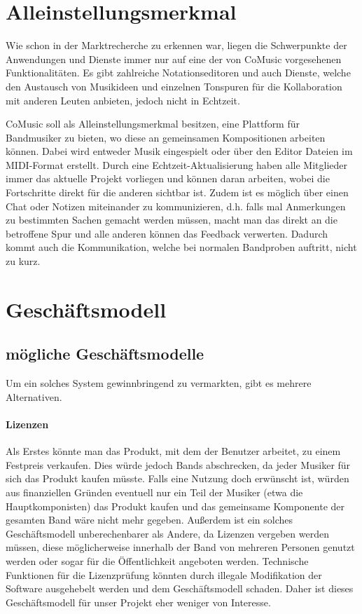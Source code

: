 \documentclass[12pt]{scrartcl}
\begin{document}
\section{Alleinstellungsmerkmal}
Wie schon in der Marktrecherche zu erkennen war, liegen die Schwerpunkte der Anwendungen und Dienste immer nur auf eine der von CoMusic vorgesehenen Funktionalitäten. Es gibt zahlreiche Notationseditoren und auch Dienste, welche den Austausch von Musikideen und einzelnen Tonspuren für die Kollaboration mit anderen Leuten anbieten, jedoch nicht in Echtzeit.

CoMusic soll als Alleinstellungsmerkmal besitzen, eine Plattform für Bandmusiker zu bieten, wo diese an gemeinsamen Kompositionen arbeiten können. Dabei wird entweder Musik eingespielt oder über den Editor Dateien im MIDI-Format erstellt. Durch eine Echtzeit-Aktualisierung haben alle Mitglieder immer das aktuelle Projekt vorliegen und können daran arbeiten, wobei die Fortschritte direkt für die anderen sichtbar ist.
Zudem ist es möglich über einen Chat oder Notizen miteinander zu kommunizieren, d.h. falls mal Anmerkungen zu bestimmten Sachen gemacht werden müssen, macht man das direkt an die betroffene Spur und alle anderen können das Feedback verwerten. Dadurch kommt auch die Kommunikation, welche bei normalen Bandproben auftritt, nicht zu kurz.


\section{Geschäftsmodell}


\subsection{mögliche Geschäftsmodelle}

Um ein solches System gewinnbringend zu vermarkten, gibt es mehrere Alternativen.

\paragraph{Lizenzen}
Als Erstes könnte man das Produkt, mit dem der Benutzer arbeitet, zu einem Festpreis verkaufen. Dies würde jedoch Bands abschrecken, da jeder Musiker für sich das Produkt kaufen müsste. Falls eine Nutzung doch erwünscht ist, würden aus finanziellen Gründen eventuell nur ein Teil der Musiker (etwa die Hauptkomponisten) das Produkt kaufen und das gemeinsame Komponente der gesamten Band wäre nicht mehr gegeben. Außerdem ist ein solches Geschäftsmodell unberechenbarer als Andere, da Lizenzen vergeben werden müssen, diese möglicherweise innerhalb der Band von mehreren Personen genutzt werden oder sogar für die Öffentlichkeit angeboten werden. Technische Funktionen für die Lizenzprüfung könnten durch illegale Modifikation der Software ausgehebelt werden und dem Geschäftsmodell schaden. Daher ist dieses Geschäftsmodell für unser Projekt eher weniger von Interesse.
\end{document}
